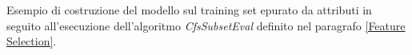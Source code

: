 Esempio di costruzione del modello sul training set epurato da attributi in seguito all'esecuzione dell'algoritmo \textit{CfsSubsetEval} definito nel paragrafo \ref{Feature Selection}.
%
%
%
%
%
%
%
%
%
